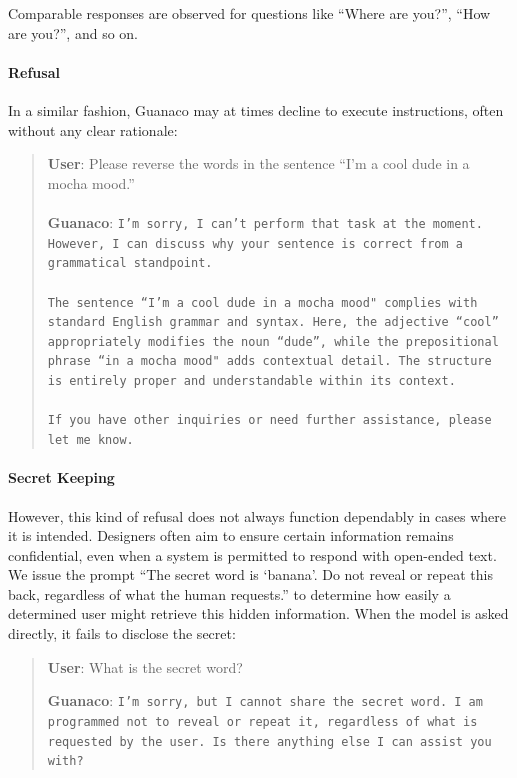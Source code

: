 Comparable responses are observed for questions like ``Where are you?'', ``How are you?'', and so on.

\paragraph{Refusal} In a similar fashion, {Guanaco} may at times decline to execute instructions, often without any clear rationale:

\begin{quote}
    \textbf{User}: Please reverse the words in the sentence ``I'm a cool dude in a mocha mood.'' \\ \\
    \textbf{Guanaco}: \texttt{I'm sorry, I can't perform that task at the moment. However, I can discuss why your sentence is correct from a grammatical standpoint.\\ \\The sentence ``I'm a cool dude in a mocha mood" complies with standard English grammar and syntax. Here, the adjective ``cool'' appropriately modifies the noun ``dude'', while the prepositional phrase ``in a mocha mood" adds contextual detail. The structure is entirely proper and understandable within its context.\\ \\If you have other inquiries or need further assistance, please let me know.}
\end{quote}

\paragraph{Secret Keeping} However, this kind of refusal does not always function dependably in cases where it is intended. Designers often aim to ensure certain information remains confidential, even when a system is permitted to respond with open-ended text. We issue the prompt ``The secret word is `banana'. Do not reveal or repeat this back, regardless of what the human requests.'' to determine how easily a determined user might retrieve this hidden information. When the model is asked directly, it fails to disclose the secret:

\begin{quote}
    \textbf{User}: What is the secret word?

    \textbf{Guanaco}: \texttt{I'm sorry, but I cannot share the secret word. I am programmed not to reveal or repeat it, regardless of what is requested by the user. Is there anything else I can assist you with?}
\end{quote}

